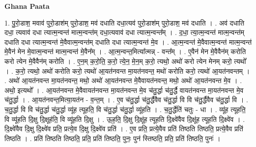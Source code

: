 \documentclass[17pt]{extarticle}
\begin{document}
\textbf{Ghana Paata } \newline

1. पु॒रो॒डाश॒ मवाव॑ पुरो॒डाश॑म् पुरो॒डाश॒ मव॑ दधाति दधा॒त्यव॑ पुरो॒डाश॑म् पुरो॒डाश॒ मव॑ दधाति । . अव॑ दधाति दधा॒ त्यवाव॑ दधा त्यात्म॒न्वन्त॑ मात्म॒न्वन्त॑म् दधा॒त्यवाव॑ दधा त्यात्म॒न्वन्त᳚म् । . द॒धा॒ त्या॒त्म॒न्वन्त॑ मात्म॒न्वन्त॑म् दधाति दधा त्यात्म॒न्वन्त॑ मे॒वैवात्म॒न्वन्त॑म् दधाति दधा त्यात्म॒न्वन्त॑ मे॒व । . आ॒त्म॒न्वन्त॑ मे॒वैवात्म॒न्वन्त॑ मात्म॒न्वन्त॑ मे॒वैन॑ मेन मे॒वात्म॒न्वन्त॑ मात्म॒न्वन्त॑ मे॒वैन᳚म् । . आ॒त्म॒न्वन्त॒मित्या᳚त्मन्न् - वन्त᳚म् । . ए॒वैन॑ मेन मे॒वैवैन॑म् करोति करो त्येन मे॒वैवैन॑म् करोति । . ए॒न॒म् क॒रो॒ति॒ क॒रो॒ त्ये॒न॒ मे॒न॒म् क॒रो॒ त्यथो॒ अथो॑ करो त्येन मेनम् करो॒ त्यथो᳚ । . क॒रो॒ त्यथो॒ अथो॑ करोति करो॒ त्यथो॑ आ॒यत॑नवन्त मा॒यत॑नवन्त॒ मथो॑ करोति करो॒ त्यथो॑ आ॒यत॑नवन्तम् । . अथो॑ आ॒यत॑नवन्त मा॒यत॑नवन्त॒ मथो॒ अथो॑ आ॒यत॑नवन्त मे॒वैवायत॑नवन्त॒ मथो॒ अथो॑ आ॒यत॑नवन्त मे॒व । . अथो॒ इत्यथो᳚ । . आ॒यत॑नवन्त मे॒वैवायत॑नवन्त मा॒यत॑नवन्त मे॒व च॑तु॒र्द्धा च॑तु॒र्द्धै वायत॑नवन्त मा॒यत॑नवन्त मे॒व च॑तु॒र्द्धा । . आ॒यत॑नवन्त॒मित्या॒यत॑न - व॒न्त॒म् । . ए॒व च॑तु॒र्द्धा च॑तु॒र्द्धैवैव च॑तु॒र्द्धा वि वि च॑तु॒र्द्धैवैव च॑तु॒र्द्धा वि । . च॒तु॒र्द्धा वि वि च॑तु॒र्द्धा च॑तु॒र्द्धा व्यू॑ह त्यूहति॒ वि च॑तु॒र्द्धा च॑तु॒र्द्धा व्यू॑हति । . च॒तु॒र्द्धेति॑ चतुः - धा । . व्यू॑ह त्यूहति॒ वि व्यू॑हति दि॒क्षु दि॒क्षूह॑ति॒ वि व्यू॑हति दि॒क्षु । . ऊ॒ह॒ति॒ दि॒क्षु दि॒क्षू॑ह त्यूहति दि॒क्ष्वे॑वैव दि॒क्षू॑ह त्यूहति दि॒क्ष्वे॑व । . दि॒क्ष्वे॑वैव दि॒क्षु दि॒क्ष्वे॑व प्रति॒ प्रत्ये॒व दि॒क्षु दि॒क्ष्वे॑व प्रति॑ । . ए॒व प्रति॒ प्रत्ये॒वैव प्रति॑ तिष्ठति तिष्ठति॒ प्रत्ये॒वैव प्रति॑ तिष्ठति । . प्रति॑ तिष्ठति तिष्ठति॒ प्रति॒ प्रति॑ तिष्ठति॒ पुनः॒ पुन॑ स्तिष्ठति॒ प्रति॒ प्रति॑ तिष्ठति॒ पुनः॑ । \newline
\end{document}
